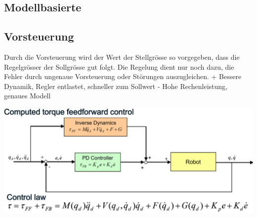 \begin{minipage}{0.5\linewidth}
    \subsection{Modellbasierte }
    \subsection{Vorsteuerung }
    Durch die Vorsteuerung wird der Wert der Stellgrösse so vorgegeben, dass die Regelgrösser der Sollgrösse gut folgt. Die Regelung dient nur noch dazu, die Fehler durch ungenaue Vorsteuerung oder Störungen auszugleichen.\newline
    {\small
    + Bessere Dynamik, Regler entlastet, schneller zum Sollwert\newline
    - Hohe Rechenleistung, genaues Modell}
\vspace{-2\baselineskip}
\end{minipage}
\begin{minipage}{0.5\linewidth}
    \includegraphics[width=\linewidth]{./bilder/Vorsteuerung}
\end{minipage}

